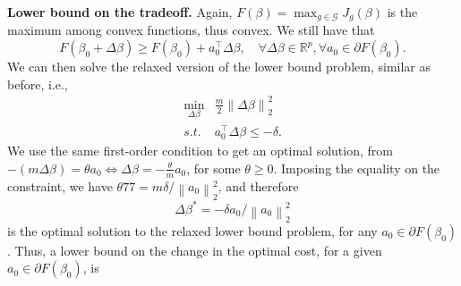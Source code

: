 \documentclass[11pt]{article}
\theoremstyle{plain}
\theoremstyle{definition}
\newcommand{\R}{\mathbb{R}}
\newcommand{\norm}[1]{\left\lVert #1 \right\rVert}
\newcommand{\1}{\mathbf{1}}
\newcommand{\G}{\mathcal{G}}
\newcommand{\A}{\mathcal{A}}
\renewcommand{\t}{^{\top}}
\renewcommand{\R}{\mathbb{R}}
\begin{document}
\noindent \textbf{Lower bound on the tradeoff.} Again, $F(\beta)=\max_{g\in \G} J_g(\beta)$ is the maximum among convex functions, thus convex. We still have that
    \begin{equation}
    F(\beta_0 + \Delta \beta) \geq F(\beta_0 ) + a_0\t\Delta \beta   ,\quad \forall \Delta \beta \in \R^p, \forall a_0\in \partial F(\beta_0).    
    \end{equation}
    We can then solve the relaxed version of the lower bound problem, similar as before, i.e.,
\begin{equation}
    \begin{array}{cc}
      \displaystyle  \min_{\Delta \beta} & \frac{m}{2}\norm{\Delta \beta}^2_{2} \\
        s.t. & a_0\t\Delta \beta \leq -\delta. %
    \end{array}
\end{equation}
We use the same first-order condition to get an optimal solution, from $- (m\Delta \beta ) = \theta a_0 \iff \Delta \beta = -\frac{\theta}{m}a_0$, for some $\theta \geq 0$. Imposing the equality on the constraint, we have $\theta77 = {m \delta}/\norm{a_0}_2^2$, and therefore \begin{equation}
\label{eq:beta_lb}
    \boxed{\Delta \beta^* ={-\delta a_0} / \norm{a_0}_{2}^2}
\end{equation} is the optimal solution to the relaxed lower bound problem, for any $a_0 \in \partial F(\beta_0)$. Thus, a lower bound on the change in the optimal cost, for a given $a_0 \in \partial F(\beta_0)$, is 
\end{document}
